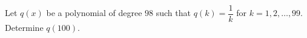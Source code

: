 Let $q(x)$ be a polynomial of degree $98$ such that $q(k)=\dfrac{1}{k}$ for $k=1,2,\ldots,99$. Determine $q(100)$.
